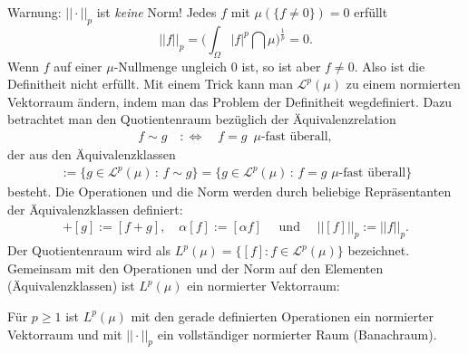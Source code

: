 Warnung: $||\cdot ||_p$ ist \textit{keine} Norm! Jedes $f$ mit $\mu(\{f \neq 0\})=0$ erfüllt \[ || f ||_p = \Big( \int_{\Omega} |f|^p \dint \mu \Big)^{\frac{1}{p}} = 0. \] 
Wenn $f$ auf einer $\mu$-Nullmenge ungleich $0$ ist, so ist aber $f\neq 0$. Also ist die Definitheit nicht erf\"ullt. Mit einem Trick kann man $\mathcal L^p(\mu)$ zu einem normierten Vektorraum \"andern, indem man das Problem der Definitheit wegdefiniert. Dazu betrachtet man den Quotientenraum bez\"uglich der  \"Aquivalenzrelation
\begin{align*}
f \sim g \quad :\Leftrightarrow\quad f = g \,\,\,\mu\text{-fast überall},
\end{align*}
der aus den \"Aquivalenzklassen 
\begin{align*}
[f]:=\big\{g\in \mathcal L^p(\mu)\,:\, f\sim g\big\}=\big\{g\in \mathcal L^p(\mu)\,:\, f=g\,\,\mu\text{-fast \"uberall} \big\}
\end{align*}
besteht. Die Operationen und die Norm werden durch beliebige Repr\"asentanten der \"Aquivalenzklassen definiert:
\begin{align*}
[f]+[g]:=[f+g], \quad \alpha [f]:=[\alpha f] \quad \text{ und }\quad ||[f]||_p:=||f||_p.
\end{align*}
Der Quotientenraum wird als  $L^p(\mu)=\{[f]: f\in \mathcal L^p(\mu)\}$ bezeichnet. Gemeinsam mit den Operationen und der Norm auf den Elementen (\"Aquivalenzklassen) ist $L^p(\mu)$ ein normierter Vektorraum:
\begin{satz}\label{Lp}
	F\"ur $p\geq 1$ ist $L^p(\mu)$ mit den gerade definierten Operationen ein normierter Vektorraum und mit $||\cdot||_p$ ein vollst\"andiger normierter Raum (Banachraum).
\end{satz}

